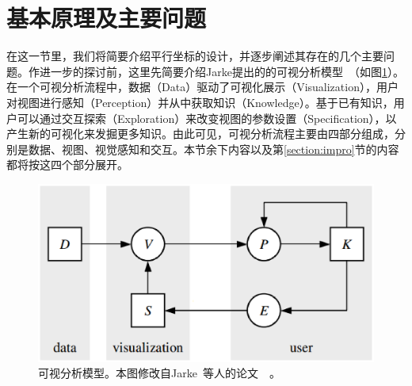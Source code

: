 \documentclass[12pt,twocolumn]{article}
\begin{document}
\section{基本原理及主要问题}
\label{section:basics&prob}
在这一节里，我们将简要介绍平行坐标的设计，并逐步阐述其存在的几个主要问题。作进一步的探讨前，这里先简要介绍Jarke提出的的可视分析模型~\citep{van2005value}（如图\ref{fig:Vis_model}）。在一个可视分析流程中，数据（Data）驱动了可视化展示（Visualization），用户对视图进行感知（Perception）并从中获取知识（Knowledge）。基于已有知识，用户可以通过交互探索（Exploration）来改变视图的参数设置（Specification），以产生新的可视化来发掘更多知识。由此可见，可视分析流程主要由四部分组成，分别是数据、视图、视觉感知和交互。本节余下内容以及第\ref{section:impro}节的内容都将按这四个部分展开。

\begin{figure}[!htb]
\centering
\includegraphics[width=0.9\linewidth]{images/Vis_model.eps}
\caption{\label{fig:Vis_model}可视分析模型。本图修改自Jarke~等人的论文~\citep{van2005value}~。
}
\end{figure}
\end{document}
